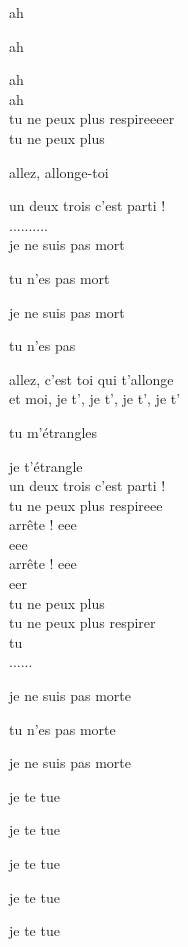 \documentclass{article}
\begin{document}
{ \raggedleft ah \\ }
{ \raggedright ah \\ }
{ \raggedleft ah \\ }
{ \centering ah \\
tu ne peux plus respireeeer \\ }
{ \raggedleft tu ne peux plus \\ }
{ \raggedright allez, allonge-toi \\ }
{ \centering un deux trois c'est parti ! \\ }
{ \centering .......... \\ }
{ \raggedleft je ne suis pas mort \\ }
{ \raggedright tu n'es pas mort \\ }
{ \raggedleft je ne suis pas mort \\ }
{ \raggedright tu n'es pas \\ }
{ \raggedleft allez, c'est toi qui t'allonge \\ }
{ \raggedleft et moi, je t', je t', je t', je t'\\ }
{ \raggedright tu m'étrangles \\ }
{ \raggedleft je t'étrangle \\ }
{ \centering un deux trois c'est parti ! \\ }
{ \raggedleft tu ne peux plus respireee \\ }
arrête ! \hfill eee \\
{ \raggedleft eee \\ }
arrête ! \hfill eee \\
{ \raggedleft eer \\ }
{ \raggedleft tu ne peux plus \\ }
{ \raggedleft tu ne peux plus respirer \\ }
{ \raggedleft tu \\ }
{ \centering ...... \\ }
{ \raggedright je ne suis pas morte \\ }
{ \raggedleft tu n'es pas morte \\ }
{ \raggedright je ne suis pas morte \\ }
{ \raggedright je te tue \\ }
{ \raggedright je te tue \\ }
{ \raggedright je te tue \\ }
{ \raggedright je te tue \\ }
{ \raggedleft je te tue \\ }
\end{document}
